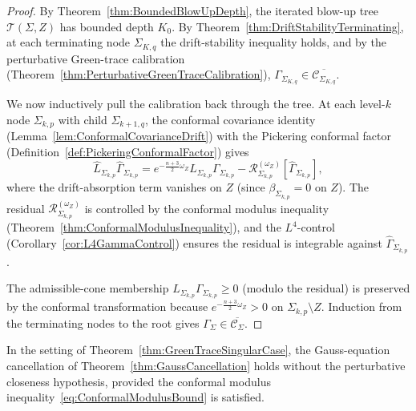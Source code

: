 \begin{proof}
By Theorem~\ref{thm:BoundedBlowUpDepth}, the iterated blow-up tree $\mathcal T(\Sigma,Z)$ has bounded depth $K_0$. By Theorem~\ref{thm:DriftStabilityTerminating}, at each terminating node $\Sigma_{K,q}$ the drift-stability inequality holds, and by the perturbative Green-trace calibration (Theorem~\ref{thm:PerturbativeGreenTraceCalibration}), $\Gamma_{\Sigma_{K,q}}\in\overline{\mathcal C_{\Sigma_{K,q}}}$.

We now inductively pull the calibration back through the tree. At each level-$k$ node $\Sigma_{k,p}$ with child $\Sigma_{k+1,q}$, the conformal covariance identity (Lemma~\ref{lem:ConformalCovarianceDrift}) with the Pickering conformal factor (Definition~\ref{def:PickeringConformalFactor}) gives
\[
    \widehat L_{\Sigma_{k,p}}\widehat\Gamma_{\Sigma_{k,p}}
    =
    e^{-\frac{n+3}{2}\omega_Z}L_{\Sigma_{k,p}}\Gamma_{\Sigma_{k,p}}-\mathcal R_{\Sigma_{k,p}}^{(\omega_Z)}[\widehat\Gamma_{\Sigma_{k,p}}],
\]
where the drift-absorption term vanishes on $Z$ (since $\beta_{\Sigma_{k,p}}=0$ on $Z$). The residual $\mathcal R_{\Sigma_{k,p}}^{(\omega_Z)}$ is controlled by the conformal modulus inequality (Theorem~\ref{thm:ConformalModulusInequality}), and the $L^4$-control (Corollary~\ref{cor:L4GammaControl}) ensures the residual is integrable against $\widehat\Gamma_{\Sigma_{k,p}}$.

The admissible-cone membership $L_{\Sigma_{k,p}}\Gamma_{\Sigma_{k,p}}\ge 0$ (modulo the residual) is preserved by the conformal transformation because $e^{-\frac{n+3}{2}\omega_Z}>0$ on $\Sigma_{k,p}\setminus Z$. Induction from the terminating nodes to the root gives $\Gamma_\Sigma\in\overline{\mathcal C_\Sigma}$.
\end{proof}

\begin{theorem}\label{thm:NonperturbativeGaussCancellation}
In the setting of Theorem~\ref{thm:GreenTraceSingularCase}, the Gauss-equation cancellation of Theorem~\ref{thm:GaussCancellation} holds without the perturbative closeness hypothesis, provided the conformal modulus inequality~\eqref{eq:ConformalModulusBound} is satisfied.
\end{theorem}


